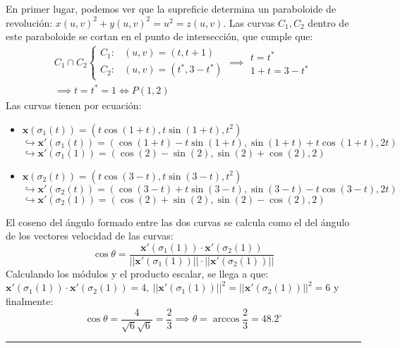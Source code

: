 En primer lugar, podemos ver que la supreficie determina un paraboloide de revolución: $x(u,v)^2+y(u,v)^2=u^2=z(u,v)$. Las curvas $C_1,C_2$ dentro de este paraboloide se cortan en el punto de intersección, que cumple que:
\begin{gather*}
    C_1\cap C_2\left \{ 
    \begin{array}{cc}
        C_1:&(u,v)=(t,t+1)\\ 
        C_2:&(u,v)=(t^*,3-t^*)  
    \end{array}
    \right .\implies \begin{array}{c}
         t=t^*  \\
         1+t=3-t^* 
    \end{array}\\
    \implies t=t^*=1\iff \boxed{P(1,2)}
\end{gather*}
Las curvas tienen por ecuación:
\begin{itemize}
\item $
\mathbf{x}(\sigma_1(t))=(t\cos(1+t),t\sin(1+t),t^2)
$\\
$
\hookrightarrow \mathbf{x'}(\sigma_1(t))=(\cos(1+t)-t\sin(1+t),\sin(1+t)+t\cos(1+t),2t)
$\\
$
\hookrightarrow \mathbf{x'}(\sigma_1(1))=(\cos(2)-\sin(2),\sin(2)+\cos(2),2)
$
\item $
\mathbf{x}(\sigma_2(t))=(t\cos(3-t),t\sin(3-t),t^2)
$\\
$
\hookrightarrow \mathbf{x'}(\sigma_2(t))=(\cos(3-t)+t\sin(3-t),\sin(3-t)-t\cos(3-t),2t)
$\\
$
\hookrightarrow \mathbf{x'}(\sigma_2(1))=(\cos(2)+\sin(2),\sin(2)-\cos(2),2)
$
\end{itemize}
El coseno del ángulo formado entre las dos curvas se calcula como el del ángulo de los vectores velocidad de las curvas:
$$
\cos \theta=\frac{\mathbf{x'}(\sigma_1(1))\cdot \mathbf{x'}(\sigma_2(1))}{||\mathbf{x'}(\sigma_1(1))||\cdot ||\mathbf{x'}(\sigma_2(1))||}
$$
Calculando los módulos y el producto escalar, se llega a que:\\
$
\mathbf{x'}(\sigma_1(1))\cdot \mathbf{x'}(\sigma_2(1))=4,\ ||\mathbf{x'}(\sigma_1(1))||^2= ||\mathbf{x'}(\sigma_2(1))||^2=6
$
y finalmente:
$$
\cos \theta =\frac{4}{\sqrt{6}\sqrt{6}}=\frac{2}{3}\implies \boxed{\theta=\arccos\frac{2}{3}=48.2^\circ }
$$
\noindent\rule{\textwidth}{0.3pt}

